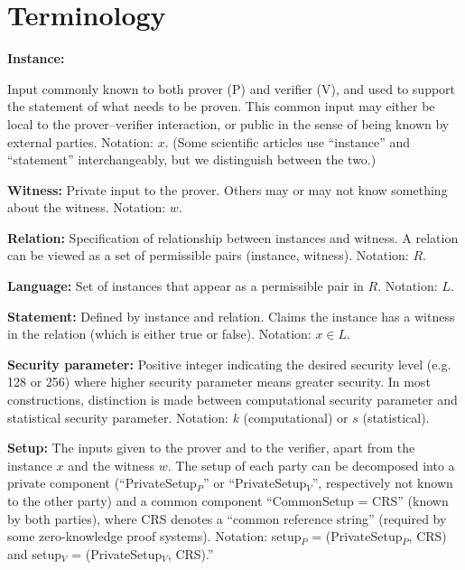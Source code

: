 \section{Terminology}
\label{security:terminology}


{\bfseries \hypertarget{def:instance}{Instance}:} 
	
	Input commonly known to both prover (P) and verifier (V), and used to support the statement of what needs to be proven.
	This common input may either be local to the prover--verifier interaction,
or public in the sense of being known by external parties. Notation: $x$.
	(Some scientific articles use ``instance'' and ``statement'' interchangeably, but we 
distinguish between the two.)
\loosen
 
{\bfseries  \hypertarget{def:witness}{Witness}:} 
Private input to the prover. Others may or may not know something about the witness. 
Notation: $w$.
 
{\bfseries \hypertarget{def:relation}{Relation}:} 
	Specification of relationship between instances and witness.
	A relation can be viewed as a set of permissible pairs (instance, witness). 
Notation: $R$.
 
{\bfseries \hypertarget{def:language}{Language}:} 
Set of instances that appear as a permissible pair in $R$. 
Notation: $L$.
 
{\bfseries \hypertarget{def:statement}{Statement}:} 
Defined by instance and relation. Claims the instance has a witness in the relation (which is either true or false). 
Notation: $x \in L$.

{\bfseries Security parameter:} 
Positive integer indicating the desired security level (e.g. 128 or 256) where higher security parameter means greater security.
In most constructions, distinction is made between computational security parameter and statistical security parameter. 
Notation: $k$ (computational) or $s$ (statistical).
 



{\bfseries Setup:} The inputs given to the prover and to the verifier, apart from the instance $x$ and the witness $w$. 
	The setup of each party can be decomposed into a private component (``PrivateSetup$_P$'' or ``PrivateSetup$_V$'', respectively not known to the other party) 
	and a common component ``CommonSetup = CRS'' (known by both parties), where CRS denotes a ``common reference string'' (required by some zero-knowledge proof systems). 
	Notation: setup$_P$ = (PrivateSetup$_P$, CRS) and setup$_V$ = (PrivateSetup$_V$, CRS).''
	\loosen

